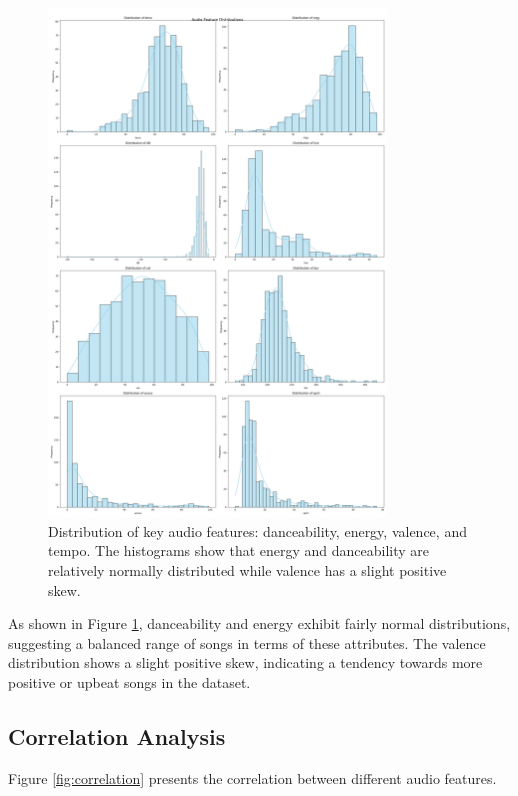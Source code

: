 \documentclass[runningheads]{llncs}
\begin{document}
\begin{figure}[h]
    \centering
    \includegraphics[width=0.8\textwidth]{audio_feature_distribution.png}
    \caption{Distribution of key audio features: danceability, energy, valence, and tempo. The histograms show that energy and danceability are relatively normally distributed while valence has a slight positive skew.}
    \label{fig:audio_features}
\end{figure}

As shown in Figure \ref{fig:audio_features}, danceability and energy exhibit fairly normal distributions, suggesting a balanced range of songs in terms of these attributes. The valence distribution shows a slight positive skew, indicating a tendency towards more positive or upbeat songs in the dataset.

\subsection{Correlation Analysis}

Figure \ref{fig:correlation} presents the correlation between different audio features.
\end{document}
